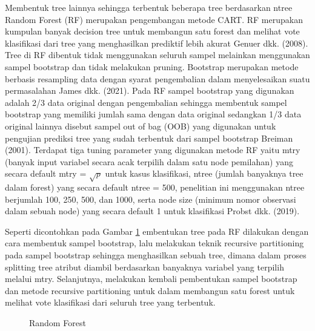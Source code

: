 Membentuk tree lainnya sehingga terbentuk beberapa tree berdasarkan ntree Random Forest (RF) merupakan pengembangan metode CART. RF merupakan kumpulan banyak decision tree untuk membangun satu forest dan melihat vote klasifikasi dari tree yang menghasilkan prediktif lebih akurat Genuer dkk. (2008). Tree di RF dibentuk tidak menggunakan seluruh sampel melainkan menggunakan sampel bootstrap dan tidak melakukan pruning. Bootstrap merupakan metode berbasis resampling data dengan syarat pengembalian dalam menyelesaikan suatu permasalahan James dkk. (2021). Pada RF sampel bootstrap yang digunakan adalah 2/3 data original dengan pengembalian sehingga membentuk sampel bootstrap yang memiliki jumlah sama dengan data original sedangkan 1/3 data original lainnya disebut sampel out of bag (OOB) yang digunakan untuk pengujian prediksi tree yang sudah terbentuk dari sampel bootstrap Breiman (2001).
Terdapat tiga tuning parameter yang digunakan metode RF yaitu mtry (banyak input variabel secara acak terpilih dalam satu node pemilahan) yang secara default mtry = $\sqrt{p}$ untuk kasus klasifikasi, ntree (jumlah banyaknya tree dalam forest) yang secara default ntree = 500, penelitian ini menggunakan ntree berjumlah 100, 250, 500, dan 1000, serta node size (minimum nomor observasi dalam sebuah node) yang secara default 1 untuk klasifikasi Probst dkk. (2019). 

Seperti dicontohkan pada Gambar \ref*{fig:rf} embentukan tree pada RF dilakukan dengan cara membentuk sampel bootstrap, lalu melakukan teknik recursive partitioning pada sampel bootstrap sehingga menghasilkan sebuah tree, dimana dalam proses splitting tree atribut diambil berdasarkan banyaknya variabel yang terpilih melalui mtry. Selanjutnya, melakukan kembali pembentukan sampel bootstrap dan metode recursive partitioning untuk dalam membangun satu forest untuk melihat vote klasifikasi dari seluruh tree yang terbentuk.

\begin{figure}
    \caption{Random Forest}
    \label{fig:rf}
  \end{figure}